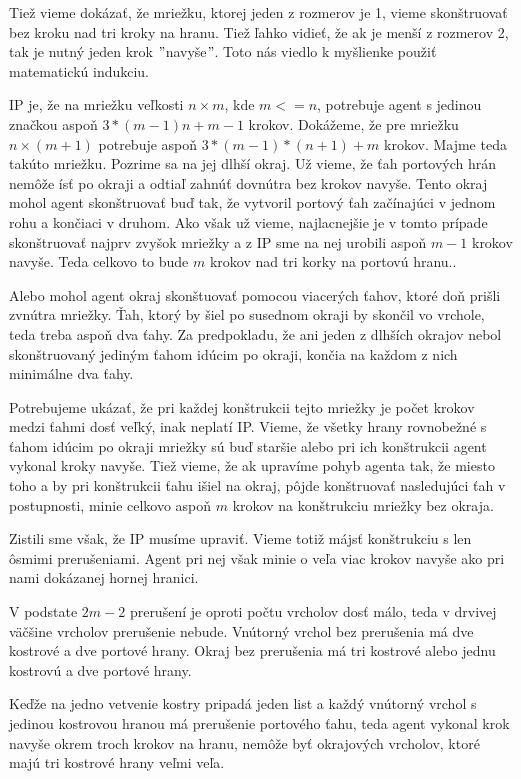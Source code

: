 Tiež vieme dokázať, že mriežku, ktorej jeden z rozmerov je 1, vieme
skonštruovať bez kroku nad tri kroky na hranu. Tiež ľahko vidieť, že ak je
menší z rozmerov 2, tak je nutný jeden krok $"$navyše$"$. Toto nás viedlo k
myšlienke použiť matematickú indukciu.

IP je, že na mriežku veľkosti $n \times m$, kde $m <= n$, potrebuje agent s
jedinou značkou aspoň $3*(m-1)n + m - 1$ krokov. Dokážeme, že pre mriežku 
$n
\times (m + 1)$ potrebuje aspoň $3*(m-1)*(n+1) + m$ krokov. Majme teda takúto mriežku.
Pozrime sa na jej dlhší okraj. Už vieme, že ťah portových hrán nemôže ísť po
okraji a odtiaľ zahnúť dovnútra bez krokov navyše. Tento okraj mohol agent
skonštruovať buď tak, že vytvoril portový ťah začínajúci v jednom rohu a
končiaci v druhom. Ako však už vieme, najlacnejšie je v tomto prípade
skonštruovať najprv zvyšok mriežky a z IP sme na nej urobili aspoň $m - 1$
krokov navyše. Teda celkovo to bude $m$ krokov nad tri korky na portovú
hranu..

Alebo mohol agent okraj skonštuovať
pomocou viacerých ťahov, ktoré doň prišli zvnútra mriežky. Ťah, ktorý by šiel
po susednom okraji by skončil vo vrchole, teda treba aspoň dva ťahy. Za
predpokladu, že ani jeden z dlhších okrajov nebol skonštruovaný jediným
ťahom idúcim po okraji, končia na každom z nich minimálne dva ťahy.

Potrebujeme ukázať, že pri každej konštrukcii tejto mriežky je počet krokov
medzi ťahmi dosť veľký, inak neplatí IP. Vieme, že všetky hrany rovnobežné s
ťahom idúcim po okraji mriežky sú buď staršie alebo pri ich konštrukcii
agent vykonal kroky navyše. Tiež vieme, že ak 
upravíme pohyb agenta tak, že miesto toho a by pri konštrukcii ťahu išiel na
okraj, pôjde konštruovať nasledujúci ťah v postupnosti, minie celkovo 
aspoň $m$ krokov na konštrukciu mriežky bez okraja.

Zistili sme však, že IP musíme upraviť. Vieme totiž májsť konštrukciu s len
ôsmimi prerušeniami. Agent pri nej však minie o veľa viac krokov navyše ako
pri nami dokázanej hornej hranici.

V podstate $2 m - 2$ prerušení je oproti počtu vrcholov dosť málo, teda v
drvivej väčšine vrcholov prerušenie nebude. Vnútorný vrchol bez prerušenia má dve
kostrové a dve portové hrany. Okraj bez prerušenia má tri kostrové alebo
jednu kostrovú a dve portové hrany. 

Keďže na jedno vetvenie kostry pripadá jeden list a každý vnútorný vrchol s
jedinou kostrovou hranou má prerušenie portového ťahu, teda agent vykonal
krok navyše okrem troch krokov na hranu, nemôže byť okrajových vrcholov,
ktoré majú tri kostrové hrany veľmi veľa.

